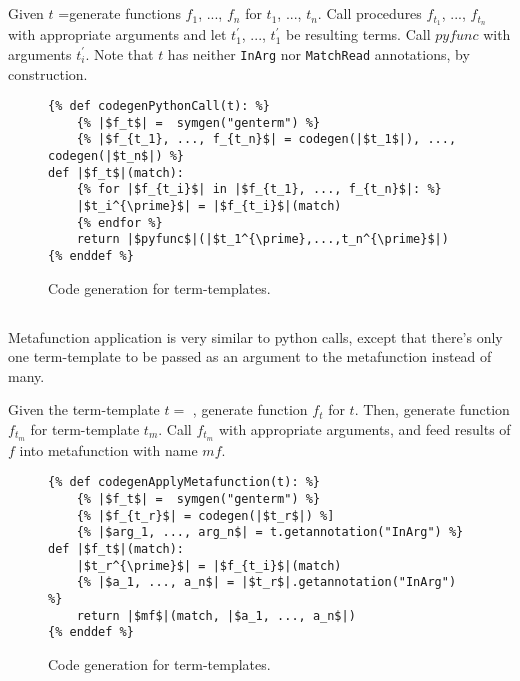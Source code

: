 \subsection{\PythonCallNoArg}
Given $t$ =\PythonCall generate functions $f_1$, ..., $f_n$ for $t_1$, ..., $t_n$. Call procedures $f_{t_1}$, ..., $f_{t_n}$ with appropriate arguments and let $t_1^{\prime}$, ..., $t_1^{\prime}$ be resulting terms. Call $pyfunc$ with arguments $t_i^{\prime}$. Note that $t$ has neither \texttt{InArg} nor \texttt{MatchRead} annotations, by construction.

\begin{figure}
\begin{verbatim}
{% def codegenPythonCall(t): %}
	{% |$f_t$| =  symgen("genterm") %}
	{% |$f_{t_1}, ..., f_{t_n}$| = codegen(|$t_1$|), ..., codegen(|$t_n$|) %}
def |$f_t$|(match):
	{% for |$f_{t_i}$| in |$f_{t_1}, ..., f_{t_n}$|: %}
	|$t_i^{\prime}$| = |$f_{t_i}$|(match)
	{% endfor %}
	return |$pyfunc$|(|$t_1^{\prime},...,t_n^{\prime}$|) 
{% enddef %}
\end{verbatim}
\caption{Code generation for \PythonCallNoArg \space term-templates.}
\label{codegen-term-pycall}
\end{figure}


\subsection{\MetafunctionApplicationNoArgs}
Metafunction application is very similar to python calls, except that there's only one term-template to be passed as an argument to the metafunction instead of many.

Given the term-template $t=$ \ApplyMetafunction, generate function $f_t$ for $t$. Then, generate function $f_{t_m}$ for term-template $t_m$. Call $f_{t_m}$ with appropriate arguments, and feed results of $f$ into metafunction with name $mf$.

\begin{figure}
\begin{verbatim}
{% def codegenApplyMetafunction(t): %}
	{% |$f_t$| =  symgen("genterm") %}
	{% |$f_{t_r}$| = codegen(|$t_r$|) %]
	{% |$arg_1, ..., arg_n$| = t.getannotation("InArg") %}
def |$f_t$|(match):
	|$t_r^{\prime}$| = |$f_{t_i}$|(match)
	{% |$a_1, ..., a_n$| = |$t_r$|.getannotation("InArg") %}
	return |$mf$|(match, |$a_1, ..., a_n$|) 
{% enddef %}
\end{verbatim}
\caption{Code generation for \MetafunctionApplicationNoArgs \space term-templates.}
\label{codegen-term-mfapply}
\end{figure}

